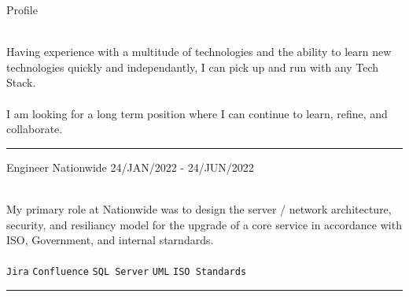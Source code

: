 \documentclass[12pt]{developercv}
\begin{document}
\begin{minipage}[t]{0.81\textwidth}

\vspace{\baselineskip}



\begin{entrylist}



\entry
	{}
	{Profile}
	{}
	{
	\\
	Having experience with a multitude of technologies and the ability to learn new technologies quickly and independantly, I can pick up and run with any Tech Stack.
	\\\\
	I am looking for a long term position where I can continue to learn, refine, and collaborate.

	\vspace{\baselineskip}
	\hrule
	}


\entry
	{}
	{Engineer \footnotesize\textmd{Nationwide}}
	{24/JAN/2022 - 24/JUN/2022 }
	{
		{
		\\
		My primary role at Nationwide was to design the server / network architecture, security, and resiliancy model for the upgrade of a core service in accordance with ISO, Government, and internal starndards. 
		\\\\
		}
	\texttt{Jira}\slashsep
	\texttt{Confluence}\slashsep
	\texttt{SQL Server}\slashsep
	\texttt{UML}\slashsep
	\texttt{ISO Standards}

	\vspace{\baselineskip}
	\hrule
	}


\end{entrylist}
\end{minipage}
\end{document}
